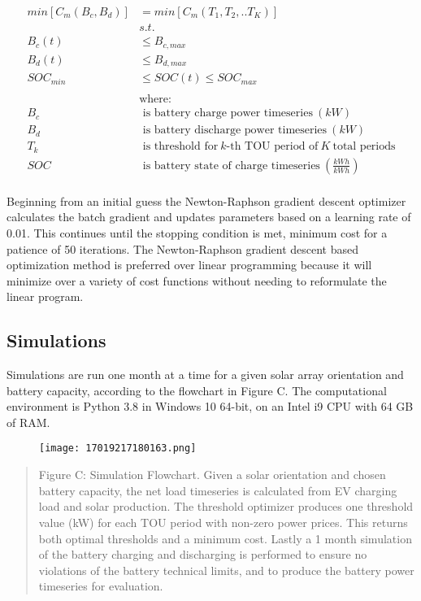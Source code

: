 \documentclass[
]{article}
\begin{document}
\begin{equation}
\begin{split}
min[C_m(B_c,B_d)] & = min[C_m(T_1,T_2,..T_K)] \\
& s.t. \\
B_c(t) & \le B_{c,max} \\
B_d(t) & \le B_{d,max} \\
SOC_{min} & \le SOC(t) \le SOC_{max} \\
\\
& \text{where:} \\
B_c & \text{ is battery charge power timeseries}\ (kW) \\
B_d & \text{ is battery discharge power timeseries}\ (kW) \\
T_k & \text{ is threshold for}\ k\text{-th TOU period of}\ K\ \text{total periods} \\
SOC & \text{ is battery state of charge timeseries}\ (\frac{kWh}{kWh}) \\
\end{split}
\end{equation}

Beginning from an initial guess the Newton-Raphson gradient descent
optimizer calculates the batch gradient and updates parameters based on
a learning rate of 0.01. This continues until the stopping condition is
met, minimum cost for a patience of 50 iterations. The Newton-Raphson
gradient descent based optimization method is preferred over linear
programming because it will minimize over a variety of cost functions
without needing to reformulate the linear program.

\hypertarget{simulations}{%
\subsection{Simulations}\label{simulations}}

Simulations are run one month at a time for a given solar array
orientation and battery capacity, according to the flowchart in Figure
C. The computational environment is Python 3.8 in Windows 10 64-bit, on
an Intel i9 CPU with 64 GB of RAM.

\begin{figure}
\centering
\texttt{[image: 17019217180163.png]}
\caption{}
\end{figure}

\begin{quote}
Figure C: Simulation Flowchart. Given a solar orientation and chosen
battery capacity, the net load timeseries is calculated from EV charging
load and solar production. The threshold optimizer produces one
threshold value (kW) for each TOU period with non-zero power prices.
This returns both optimal thresholds and a minimum cost. Lastly a 1
month simulation of the battery charging and discharging is performed to
ensure no violations of the battery technical limits, and to produce the
battery power timeseries for evaluation.
\end{quote}
\end{document}
